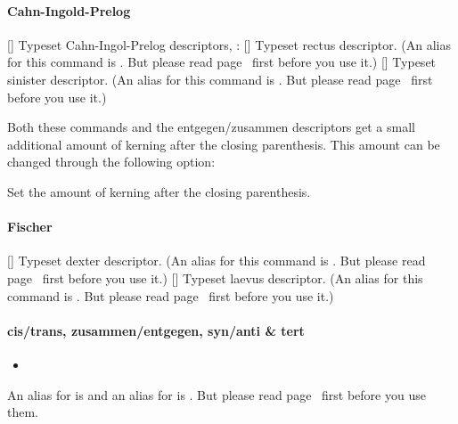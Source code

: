 \documentclass[load-preamble+]{cnltx-doc}
\begin{document}
\paragraph{Cahn-Ingold-Prelog}\label{par:cip}
\begin{commands}
  []
    Typeset Cahn-Ingol-Prelog descriptors, \eg:  
  [\quad\iupac{\rectus}]
    Typeset rectus descriptor.  (An alias for this command is .  But
    please read page~\pageref{desc:one-letter-commands} first before you use
    it.)
  [\quad\iupac{\sinister}]
    Typeset sinister descriptor.  (An alias for this command is .  But
    please read page~\pageref{desc:one-letter-commands} first before you use
    it.)
\end{commands}

Both these commands and the entgegen/zusammen descriptors get a small
additional amount of kerning after the closing parenthesis.  This amount can
be changed through the following option:
\begin{options}
  \Default{.075em}
    Set the amount of kerning after the closing parenthesis.
\end{options}

\paragraph{Fischer}
\begin{commands}
  [\quad\iupac{\dexter}]
    Typeset dexter descriptor.  (An alias for this command is .  But
    please read page~\pageref{desc:one-letter-commands} first before you use
    it.)
  [\quad\iupac{\laevus}]
    Typeset laevus descriptor.  (An alias for this command is .  But
    please read page~\pageref{desc:one-letter-commands} first before you use
    it.)
\end{commands}

\paragraph{cis/trans, zusammen/entgegen, syn/anti \& tert}
\begin{itemize}
  \item[]
       \iupac{\cis} \quad
     \iupac{\trans} \quad
       \iupac{\fac} \quad
       \iupac{\mer} \quad
     \iupac{\zusammen} \quad
     \iupac{\entgegen} \quad
       \iupac{\syn} \quad
      \iupac{\anti} \quad
      \iupac{\tert}
\end{itemize}
An alias for  is  and an alias for  is
.  But please read page~\pageref{desc:one-letter-commands} first before
you use them.
\end{document}
